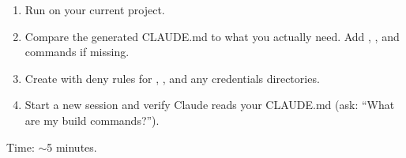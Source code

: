 \begin{trybox}
\begin{enumerate}
  \item Run  on your current project.
  \item Compare the generated CLAUDE.md to what you actually need.
    Add , , and  commands if missing.
  \item Create  with deny rules for ,
    , and any credentials directories.
  \item Start a new session and verify Claude reads your CLAUDE.md
    (ask: ``What are my build commands?'').
\end{enumerate}
Time: $\sim$5 minutes.
\end{trybox}
